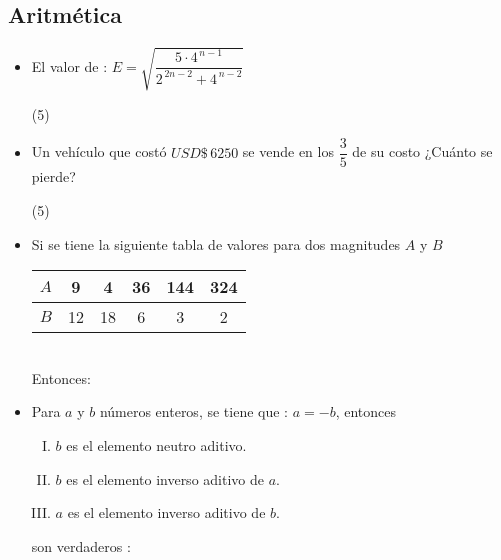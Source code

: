 \documentclass[10pt, twocolumn, landscape, a4paper]{article}
\begin{document}
\subsection*{Aritmética}
\begin{itemize}
\item{El valor de : $E = \sqrt{\dfrac{5 \cdot 4^{\,n - 1} }{2^{\,2n - 2} + 4^{\,n - 2}}}$ 

\begin{tasks}(5)
\end{tasks}
}
\item{Un vehículo que costó $USD\$\,6250$ se vende en los $\dfrac{3}{5}$ de su costo ¿Cuánto se pierde?
\begin{tasks}(5)
\end{tasks}

}
\item{Si se tiene la siguiente tabla de valores para dos magnitudes $A$ y $B$ \\

\begin{tabular}{|c|c|c|c|c|c|}
	\hline 
	$A$ & 9 & 4 & 36 & 144 & 324 \\
	\hline
	$B$ & 12 & 18 & 6 & 3 & 2 \\
	\hline 
\end{tabular} \\

Entonces:

\begin{tasks}
\end{tasks}
}
\item{Para $a$ y $b$ números enteros, se tiene que : $a = -b$, entonces 
\begin{enumerate}[I) ]
\item{$b$ es el elemento neutro aditivo.}
\item{$b$ es el elemento inverso aditivo de $a$.}
\item{$a$ es el elemento inverso aditivo de $b$.}
\end{enumerate}
son verdaderos : 

}
\end{itemize}
\end{document}

